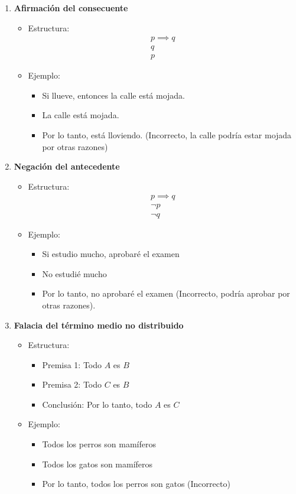 \begin{enumerate}
	\item \textbf{Afirmación del consecuente}
	
	\begin{itemize}
		\item Estructura:
		\[ \begin{array}{l}
			p \implies q\\
			q \\ \hline
			p
		\end{array} \]
		\item Ejemplo:
		\begin{itemize}
			\item Si llueve, entonces la calle está mojada.
			\item La calle está mojada.
			\item Por lo tanto, está lloviendo. (Incorrecto, la calle podría estar mojada por otras razones)
		\end{itemize}
	\end{itemize}
	
	\item \textbf{Negación del antecedente}
	\begin{itemize}
		\item Estructura:
		\[ \begin{array}{l}
			p \implies q\\
			\neg p \\ \hline
			\neg q
		\end{array} \]
		\item Ejemplo:
		\begin{itemize}[itemsep=-5pt]
			\item Si estudio mucho, aprobaré el examen
			\item No estudié mucho
			\item Por lo tanto, no aprobaré el examen (Incorrecto, podría aprobar por otras razones).
		\end{itemize}
	\end{itemize}
	
	\item \textbf{Falacia del término medio no distribuido}
	\begin{itemize}
		\item Estructura:
		\begin{itemize}[itemsep=-5pt]
			\item Premisa 1: Todo $A$ es $B$
			\item Premisa 2: Todo $C$ es $B$
			\item Conclusión: Por lo tanto, todo $A$ es $C$
		\end{itemize}
		\item Ejemplo:
		\begin{itemize}[itemsep=-5pt]
			\item Todos los perros son mamíferos
			\item Todos los gatos son mamíferos
			\item Por lo tanto, todos los perros son gatos (Incorrecto)
		\end{itemize}
	\end{itemize}
	

\end{enumerate}
